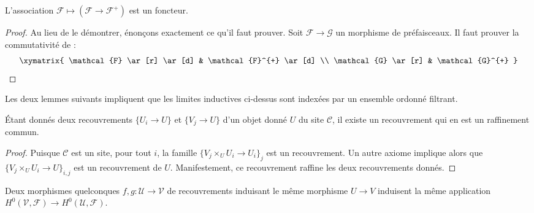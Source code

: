 \begin{lemma}
\label{lemma-plus-functorial}
L’association $\mathcal{F} \mapsto
(\mathcal{F} \to \mathcal{F}^+)$
est un foncteur.
\end{lemma}

\begin{proof}
Au lieu de le démontrer, énonçons exactement ce qu’il faut prouver.
Soit $\mathcal{F} \to \mathcal{G}$ un morphisme de préfaisceaux. Il faut prouver
la commutativité de :
$$
\xymatrix{
\mathcal{F} \ar[r] \ar[d]
&
\mathcal{F}^{+} \ar[d]
\\
\mathcal{G} \ar[r]
&
\mathcal{G}^{+}
}
$$
\end{proof}

\noindent
Les deux lemmes suivants impliquent que les limites inductives ci-dessus sont indexées
par un ensemble ordonné filtrant.

\begin{lemma}
\label{lemma-common-refinement}
Étant donnés deux recouvrements $\{U_i \to U\}$
et $\{V_j \to U\}$ d’un objet donné $U$ du site
$\mathcal{C}$, il existe un recouvrement qui en est un
raffinement commun.
\end{lemma}

\begin{proof}
Puisque $\mathcal{C}$ est un site, pour tout $i$, la
famille $\{V_j \times_U U_i \to U_i\}_j$ est un recouvrement.
Un autre axiome implique alors que $\{V_j \times_U U_i \to U\}_{i, j}$
est un recouvrement de $U$. Manifestement, ce recouvrement raffine les deux
recouvrements donnés.
\end{proof}

\begin{lemma}
\label{lemma-independent-refinement}
Deux morphismes quelconques $f, g: \mathcal{U} \to \mathcal{V}$ de recouvrements
induisant le même morphisme $U \to V$ induisent la même
application $H^0(\mathcal{V}, \mathcal{F}) \to  H^0(\mathcal{U}, \mathcal{F})$.
\end{lemma}


